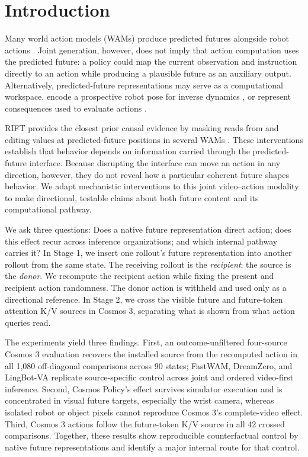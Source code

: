 \section{Introduction}
\label{sec:introduction}

Many world action models (WAMs) produce predicted futures alongside robot actions \citep{kim2026cosmospolicy,nvidia2026cosmos3}. Joint generation, however, does not imply that action computation uses the predicted future: a policy could map the current observation and instruction directly to an action while producing a plausible future as an auxiliary output. Alternatively, predicted-future representations may serve as a computational workspace, encode a prospective robot pose for inverse dynamics \citep{hu2025vpp,du2023unipi}, or represent consequences used to evaluate actions \citep{ebert2018visualforesight,du2024videolanguage}.

RIFT provides the closest prior causal evidence by masking reads from and editing values at predicted-future positions in several WAMs \citep{zhang2026rift}. These interventions establish that behavior depends on information carried through the predicted-future interface. Because disrupting the interface can move an action in any direction, however, they do not reveal how a particular coherent future shapes behavior. We adapt mechanistic interventions to this joint video--action modality to make directional, testable claims about both future content and its computational pathway.

We ask three questions: Does a native future representation direct action; does this effect recur across inference organizations; and which internal pathway carries it? In Stage 1, we insert one rollout's future representation into another rollout from the same state. The receiving rollout is the \emph{recipient}; the source is the \emph{donor}. We recompute the recipient action while fixing the present and recipient action randomness. The donor action is withheld and used only as a directional reference. In Stage 2, we cross the visible future and future-token attention K/V sources in Cosmos 3, separating what is shown from what action queries read.

The experiments yield three findings. First, an outcome-unfiltered four-source Cosmos 3 evaluation recovers the installed source from the recomputed action in all 1,080 off-diagonal comparisons across 90 states; FastWAM, DreamZero, and LingBot-VA replicate source-specific control across joint and ordered video-first inference. Second, Cosmos Policy's effect survives simulator execution and is concentrated in visual future targets, especially the wrist camera, whereas isolated robot or object pixels cannot reproduce Cosmos 3's complete-video effect. Third, Cosmos 3 actions follow the future-token K/V source in all 42 crossed comparisons. Together, these results show reproducible counterfactual control by native future representations and identify a major internal route for that control.

